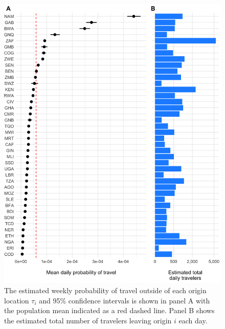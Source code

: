 \documentclass[
]{book}
\begin{document}
\begin{figure}

{\centering \includegraphics[width=1\linewidth]{figures/mobility_travel_prob_tau} 

}

\caption{The estimated weekly probability of travel outside of each origin location $\tau_i$ and 95\% confidence intervals is shown in panel A with the population mean indicated as a red dashed line. Panel B shows the estimated total number of travelers leaving origin $i$ each day.}\label{fig:mobility-departure}
\end{figure}
\end{document}
